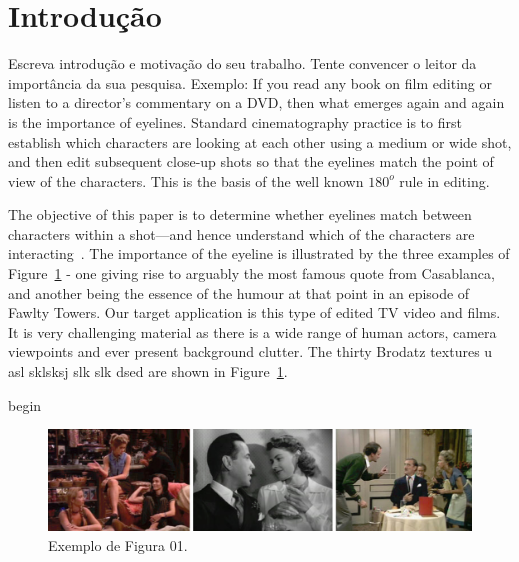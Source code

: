 \documentclass{classe_cn}                 %
\begin{document}

\section{Introdução}

Escreva introdução e motivação do seu trabalho. Tente convencer o leitor da importância da sua pesquisa. Exemplo: If you read any book on film editing or listen to a director's commentary on a DVD, then what emerges again and again is the importance of eyelines. Standard cinematography practice is to first establish which characters are looking at each other using a medium or wide shot, and then edit subsequent close-up shots so that the eyelines match the point of view of the characters. This is the basis of the well known $180^{o}$ rule in editing.

The objective of this paper is to determine whether eyelines match between characters within a shot—and hence understand which of the characters are interacting~\cite{Pressman:2007}. The importance of the eyeline is illustrated by the three examples of Figure~\ref{tag_figura_01} - one giving rise to arguably the most famous quote from Casablanca, and another being the essence of the humour at that point in an episode of Fawlty Towers. Our target application is this type of edited TV video and films. It is very challenging material as there is a wide range of human actors, camera viewpoints and ever present background clutter. The thirty Brodatz textures u asl sklsksj slk slk dsed are shown in Figure~\ref{tag_figura_01}.

begin
\begin{figure}[h!]
  \begin{center}
    \includegraphics[width=1.0 \textwidth]{figura01.jpg}
    \caption{Exemplo de Figura 01.} 
    \label{tag_figura_01}
  \end{center}
\end{figure}
\end{document}
